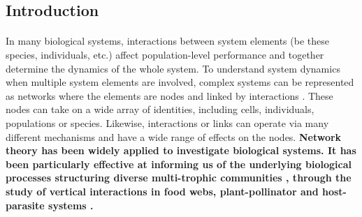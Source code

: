 \documentclass[a4,12pt]{article}
\begin{document}
\begin{refsection}

\section{Introduction}

    
    \paragraph{}
    In many biological systems, interactions between system elements (be these species, individuals, etc.) affect population-level performance and together determine the dynamics of the whole system. To understand system dynamics when multiple system elements are involved, complex systems can be represented as networks where the elements are nodes and linked by interactions \parencite{Pimm1978}. These nodes can take on a wide array of identities, including cells, individuals, populations or species. Likewise, interactions or links can operate via many different mechanisms and have a wide range of effects on the nodes. \textbf{Network theory has been widely applied to investigate biological systems. It has been particularly effective at informing us of the underlying biological processes structuring diverse multi-trophic communities \parencite{Dunne2002, Thompson2012}, through the study of vertical interactions in food webs, plant-pollinator and host-parasite systems \parencite{Lafferty2008, Stouffer2014, Cirtwill2015a}.}




\end{refsection}
\end{document}

